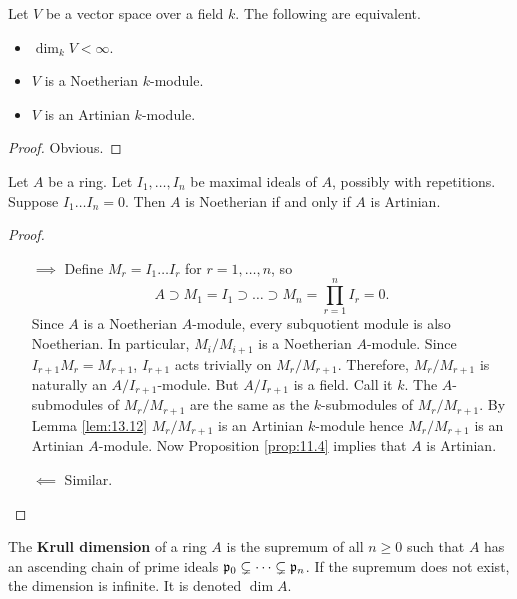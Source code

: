 \pagebreak

\begin{lemma}
\label{lem:13.12}
Let $ V $ be a vector space over a field $ k $. The following are equivalent.
\begin{itemize}
\item $ \dim_k V < \infty $.
\item $ V $ is a Noetherian $ k $-module.
\item $ V $ is an Artinian $ k $-module.
\end{itemize}
\end{lemma}

\begin{proof}
Obvious.
\end{proof}

\begin{lemma}
\label{lem:13.13}
Let $ A $ be a ring. Let $ I_1, \dots, I_n $ be maximal ideals of $ A $, possibly with repetitions. Suppose $ I_1 \dots I_n = 0 $. Then $ A $ is Noetherian if and only if $ A $ is Artinian.
\end{lemma}

\begin{proof}
\hfill
\begin{itemize}
\item[$ \implies $] Define $ M_r = I_1 \dots I_r $ for $ r = 1, \dots, n $, so
$$ A \supset M_1 = I_1 \supset \dots \supset M_n = \prod_{r = 1}^n I_r = 0. $$
Since $ A $ is a Noetherian $ A $-module, every subquotient module is also Noetherian. In particular, $ M_i / M_{i + 1} $ is a Noetherian $ A $-module. Since $ I_{r + 1}M_r = M_{r + 1} $, $ I_{r + 1} $ acts trivially on $ M_r / M_{r + 1} $. Therefore, $ M_r / M_{r + 1} $ is naturally an $ A / I_{r + 1} $-module. But $ A / I_{r + 1} $ is a field. Call it $ k $. The $ A $-submodules of $ M_r / M_{r + 1} $ are the same as the $ k $-submodules of $ M_r / M_{r + 1} $. By Lemma \ref{lem:13.12} $ M_r / M_{r + 1} $ is an Artinian $ k $-module hence $ M_r / M_{r + 1} $ is an Artinian $ A $-module. Now Proposition \ref{prop:11.4} implies that $ A $ is Artinian.
\item[$ \impliedby $] Similar.
\end{itemize}
\end{proof}

\begin{definition}
The \textbf{Krull dimension} of a ring $ A $ is the supremum of all $ n \ge 0 $ such that $ A $ has an ascending chain of prime ideals $ \mathfrak{p}_0 \subsetneq \dots \subsetneq \mathfrak{p}_n $. If the supremum does not exist, the dimension is infinite. It is denoted $ \dim A $.
\end{definition}

